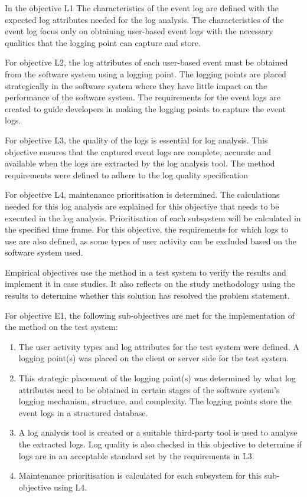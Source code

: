 \begin{enumerate}[label=\textbf{\Roman*.}]
		In  the objective L1 The characteristics of the event log are defined with the expected log attributes needed for the log analysis. The characteristics of the event log focus only on obtaining user-based event logs with the necessary qualities that the logging point can capture and store.\par For objective L2, the log attributes of each user-based event must be obtained from the software system using a logging point. The logging points are placed strategically in the software system where they have little impact on the performance of the software system. The requirements for the event logs are created to guide developers in making the logging points to capture the event logs. \par For objective L3, the quality of the logs is essential for log analysis. This objective ensures that the captured event logs are complete, accurate and available when the logs are extracted by the log analysis tool. The method requirements were defined to adhere to the log quality specification\par For objective L4, maintenance prioritisation is determined. The calculations needed for this log analysis are explained for this objective that needs to be executed in the log analysis. Prioritisation of each subsystem will be calculated in the specified time frame. For this objective, the requirements for which logs to use are also defined, as some types of user activity can be excluded based on the software system used.\par Empirical objectives use the method in a test system to verify the results and implement it in case studies. It also reflects on the study methodology using the results to determine whether this solution has resolved the problem statement.\par For objective E1, the following sub-objectives are met for the implementation of the method on the test system:

		\begin{enumerate}
			\item The user activity types and log attributes for the test system were defined. A logging point(s) was placed on the client or server side for the test system.
			\item This strategic placement of the logging point(s) was determined by what log attributes need to be obtained in certain stages of the software system's logging mechanism, structure, and complexity. The logging points store the event logs in a structured database.
			\item A log analysis tool is created or a suitable third-party tool is used to analyse the extracted logs. Log quality is also checked in this objective to determine if logs are in an acceptable standard set by the requirements in L3. 
			\item Maintenance prioritisation is calculated for each subsystem for this sub-objective using L4.
		\end{enumerate} 


\end{enumerate}
